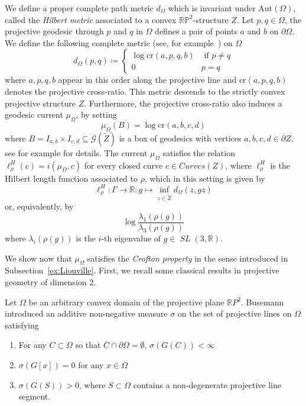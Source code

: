 \documentclass[12pt,article]{amsart}
\numberwithin{equation}{section}
\numberwithin{figure}{section}
\theoremstyle{definition}
\theoremstyle{plain}
\newcommand\R{\ensuremath{\mathbb{R}}}
\newcommand*{\wt}[1]{\widetilde{#1}}
\DeclareMathOperator{\SL}{\mathit{SL}}
\newcommand{\Curves}{\mathit{Curves}}
\begin{document}
We define a proper complete path metric $d_\Omega$ which is invariant under $\mathrm{Aut}(\Omega)$, called the \emph{Hilbert metric} associated to a convex $\mathbb{RP}^2$-structure $Z$.
Let $p,q \in \Omega$, the projective geodesic through $p$ and $q$ in $\Omega$ defines a pair of points $a$ and $b$ on $\partial \Omega$. We define the following complete metric (see, for example~\cite[Theorem~2.1]{Bea99:HilbertDomain}) on $\Omega$
\begin{equation}
\label{hilbert metric}
d_\Omega (p,q) \coloneqq \left \{ \begin{matrix} \log{\mathrm{cr}(a,p,q,b)}& \mbox{ if } p \neq q \\ 0 & p=q \end{matrix} \right.
\end{equation}
where $a,p,q,b$ appear in this order along the projective line and
$\mathrm{cr}(a,p,q,b)$ denotes the projective cross-ratio.
This metric descends to the strictly convex projective structure $Z$.
Furthermore, the projective cross-ratio also induces a geodesic current $\mu_{\Omega}$, by setting 
 \[
 \mu_{\Omega}(B)=\log \mathrm{cr}(a,b,c,d)
 \]
where $B=I_{a,b} \times I_{c,d} \subseteq \mathcal{G}(\wt{Z})$ is a box of geodesics with vertices $a,b,c,d \in \partial Z$, see for example \cite[Subsection 4.1]{BIPP21:Crossratios} for details. 
The current $\mu_\Omega$ satisfies the relation
$\ell_{\rho}^H(c)=i(\mu_{\Omega},c)$ for every closed curve $c \in \Curves(Z)$, where $\ell_{\rho}^H$ is the Hilbert length function associated to $\rho$, which in this setting is given by
\[
\ell_\rho^H \colon \Gamma \to \R : g \mapsto \inf_{z \in \wt{Z}} d_{\Omega}(z,g z)
\]
or, equivalently, by
\[\log{\frac{\lambda_1 (\rho(g))}{\lambda_3 (\rho(g))}} 
\]
where $\lambda_i (\rho(g))$ is the $i$-th eigenvalue of $g \in \SL (3, \R)$.

We show now that $\mu_{\Omega}$ satisfies the \emph{Crofton property} in the sense introduced in Subsection~\ref{ex:Liouville}.
First, we recall some classical results in projective geometry of dimension 2.

Let $\Omega$ be an arbitrary convex domain of the projective plane $\mathbb{R}P^2$. Busemann~\cite{Bus55:Geometry} introduced an additive non-negative measure $\sigma$ on the set of projective lines on $\Omega$ satisfying
\begin{enumerate}
\item For any $C \subset \Omega$ so that $\overline{C} \cap \partial \Omega = \emptyset$, $\sigma(G(C))<\infty$
\item $\sigma(G[x])=0$ for any $x \in \Omega$
\item $\sigma(G(S))>0$, where $S \subset \Omega$ contains a non-degenerate projective line segment.
\end{enumerate}
\end{document}
